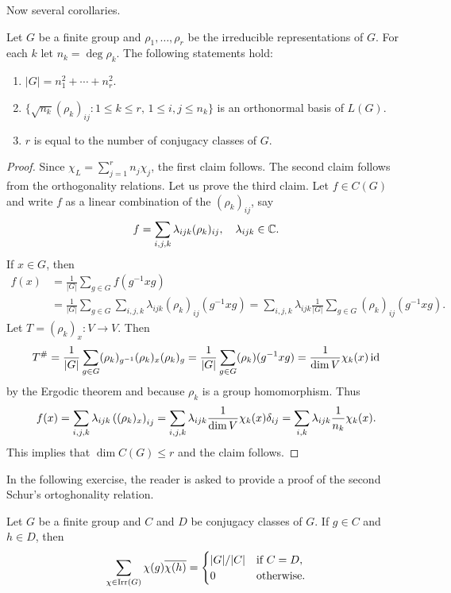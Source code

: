Now several corollaries. 

\begin{corollary}
    Let $G$ be a finite group and $\rho_1,\dots,\rho_r$ be the irreducible representations of $G$. 
    For each $k$ let $n_k=\deg\rho_k$. The following statements hold:
    \begin{enumerate}
        \item $|G|=n_1^2+\cdots+n_r^2$.
        \item $\{\sqrt{n_k}(\rho_k)_{ij}:1\leq k\leq r,\,1\leq i,j\leq n_k\}$
            is an orthonormal basis of $L(G)$. 
        \item $r$ is equal to the number of conjugacy classes of $G$. 
    \end{enumerate}
\end{corollary}

\begin{proof}
    Since $\chi_L=\sum_{j=1}^rn_j\chi_j$, the first claim follows. 
    The second claim follows from the orthogonality relations. Let us prove the third claim. Let $f\in C(G)$ and write $f$ 
    as a linear combination of the $(\rho_k)_{ij}$, say
    \[
    f=\sum_{i,j,k}\lambda_{ijk}(\rho_k)_{ij},\quad\lambda_{ijk}\in\mathbb{C}.
    \]
    If $x\in G$, then 
    \begin{align*}
    f(x)&=\frac{1}{|G|}\sum_{g\in G}f(g^{-1}xg)\\
    &=\frac{1}{|G|}\sum_{g\in G}\sum_{i,j,k}\lambda_{ijk}(\rho_k)_{ij}(g^{-1}xg)
    =\sum_{i,j,k}\lambda_{ijk} \frac{1}{|G|}\sum_{g\in G}(\rho_k)_{ij}(g^{-1}xg). 
    \end{align*}
    Let $T=(\rho_k)_x\colon V\to V$. Then
    \[
    T^{\#}=\frac{1}{|G|}\sum_{g\in G}(\rho_k)_{g^{-1}}(\rho_k)_x(\rho_k)_g
    =\frac{1}{|G|}\sum_{g\in G}(\rho_k)(g^{-1}xg)
    =\frac{1}{\dim V}\chi_k(x)\operatorname{id}
    \]
    by the Ergodic theorem and because 
    $\rho_k$ is a group homomorphism. Thus 
    \[
    f(x)=\sum_{i,j,k}\lambda_{ijk} \left((\rho_k)_x\right)_{ij}
    =\sum_{i,j,k}\lambda_{ijk}\frac{1}{\dim V}\chi_k(x)\delta_{ij}
    =\sum_{i,k}\lambda_{ijk}\frac{1}{n_k}\chi_k(x).\qedhere 
    \]
    This implies that $\dim C(G)\leq r$ and the claim follows. 
\end{proof}

In the following exercise, the reader is asked to provide a proof of the second 
Schur's ortoghonality relation. 

\begin{exercise}
    Let $G$ be a finite group and 
    $C$ and $D$ be conjugacy classes of $G$. If $g\in C$ and $h\in D$, then
    \[
    \sum_{\chi\in\operatorname{Irr}(G)}\chi(g)\overline{\chi(h)}=
    \begin{cases}
    |G|/|C| & \text{if $C=D$},\\
    0 & \text{otherwise}.
    \end{cases}
    \]
\end{exercise}